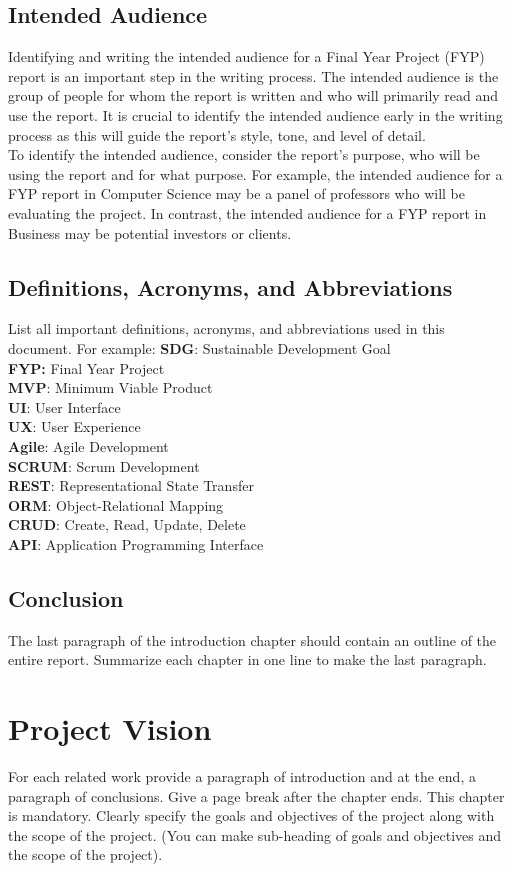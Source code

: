 \documentclass{FastFyp}
\begin{document}
\section{Intended Audience}
Identifying and writing the intended audience for a Final Year Project (FYP) report is an important step in the writing process. The intended audience is the group of people for whom the report is written and who will primarily read and use the report. It is crucial to identify the intended audience early in the writing process as this will guide the report's style, tone, and level of detail.\\
To identify the intended audience, consider the report's purpose, who will be using the report and for what purpose. For example, the intended audience for a FYP report in Computer Science may be a panel of professors who will be evaluating the project. In contrast, the intended audience for a FYP report in Business may be potential investors or clients.
\section{Definitions, Acronyms, and Abbreviations}
List all important definitions, acronyms, and abbreviations used in this document. For example: 
\textbf{SDG}: Sustainable Development Goal\\
\textbf{FYP:} Final Year Project\\
\textbf{MVP}: Minimum Viable Product\\
\textbf{UI}: User Interface\\
\textbf{UX}: User Experience\\
\textbf{Agile}: Agile Development\\
\textbf{SCRUM}: Scrum Development\\
\textbf{REST}: Representational State Transfer\\
\textbf{ORM}: Object-Relational Mapping\\
\textbf{CRUD}: Create, Read, Update, Delete\\
\textbf{API}: Application Programming Interface
\section{Conclusion}
The last paragraph of the introduction chapter should contain an outline of the entire report. Summarize each chapter in one line to make the last paragraph.
\chapter{Project Vision}
For each related work provide a paragraph of introduction and at the end, a paragraph of conclusions. Give a page break after the chapter ends.  This chapter is mandatory.  
Clearly specify the goals and objectives of the project along with the scope of the project. (You can make sub-heading of goals and objectives and the scope of the project).
\end{document}
